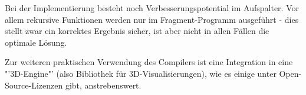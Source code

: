 \documentclass[twoside,a4paper,fleqn,12pt]{book}
\begin{document}
Bei der Implementierung besteht noch Verbesserungspotential im Aufspalter. 
Vor allem rekursive Funktionen werden nur im Fragment-Programm ausgeführt - dies stellt zwar ein korrektes
Ergebnis sicher, ist aber nicht in allen Fällen die optimale Lösung.


Zur weiteren praktischen Verwendung des Compilers ist eine Integration in eine "'3D-Engine"' (also Bibliothek für 3D-Visualisierungen), wie es einige
unter Open-Source-Lizenzen gibt, anstrebenswert.

\cleardoublepage
\appendix

\printglossaries


\end{document}
